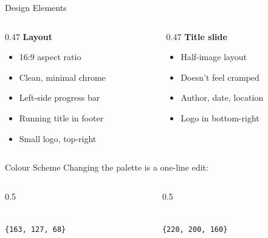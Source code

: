 \documentclass[aspectratio=169, 11pt]{beamer}
\begin{document}
\begin{frame}{Design Elements}
  \begin{columns}[T]
    \begin{column}{0.47\textwidth}
      \textcolor{PrimaryColor}{\textbf{Layout}} \\[4pt]
      \begin{itemize}
        \item 16:9 aspect ratio
        \item Clean, minimal chrome
        \item Left-side progress bar
        \item Running title in footer
        \item Small logo, top-right
      \end{itemize}
    \end{column}
    \begin{column}{0.47\textwidth}
      \textcolor{PrimaryColor}{\textbf{Title slide}} \\[4pt]
      \begin{itemize}
        \item Half-image layout
        \item Doesn't feel cramped
        \item Author, date, location
        \item Logo in bottom-right
      \end{itemize}
    \end{column}
  \end{columns}
\end{frame}

\begin{frame}{Colour Scheme}
  Changing the palette is a one-line edit:

  \vskip10pt
  \begin{columns}[c]
    \begin{column}{0.5\textwidth}
      \centering
      \\[4pt]
      \texttt{\footnotesize\{163,\,127,\,68\}}
    \end{column}
    \begin{column}{0.5\textwidth}
      \centering
      \\[4pt]
      \texttt{\footnotesize\{220,\,200,\,160\}}
    \end{column}
  \end{columns}
\end{frame}
\end{document}
